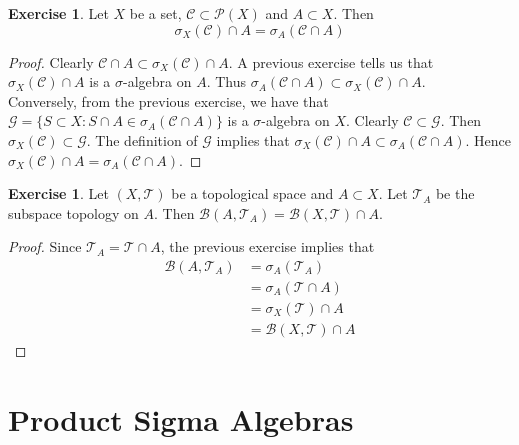 \documentclass{book}
\theoremstyle{definition}
\newtheorem{ex}[definition]{Exercise}
\newcommand{\sig}{\sigma}
\newcommand{\MB}{\mathcal{B}}
\newcommand{\MC}{\mathcal{C}}
\newcommand{\MG}{\mathcal{G}}
\newcommand{\MP}{\mathcal{P}}
\newcommand{\MT}{\mathcal{T}}
\newcommand{\lex}[1]{\label{ex:#1}}
\DeclareMathOperator*{\0}{\mbf{0}}
\DeclareMathOperator*{\1}{\mbf{1}}
\begin{document}
	\begin{ex} \lex{24004} 
		Let $X$ be a set, $\MC \subset \MP(X)$ and $A \subset X$. Then $$\sig_X(\MC) \cap A = \sig_A(\MC \cap A)$$
	\end{ex}
	
	\begin{proof}
		Clearly $\MC \cap A \subset \sig_X(\MC) \cap A$. A previous exercise tells us that $\sig_X(\MC) \cap A$ is a $\sig$-algebra on $A$. Thus $\sig_A(\MC \cap A) \subset \sig_X(\MC) \cap A$. \vspace{3mm} \\ 
		Conversely, from the previous exercise, we have that $\MG = \{S \subset X: S \cap A \in \sig_A(\MC \cap A)\}$ is a $\sig$-algebra on $X$. Clearly $\MC \subset \MG$. Then $\sig_X(\MC) \subset \MG$. The definition of $\MG$ implies that $\sig_X(\MC) \cap A \subset \sig_A(\MC \cap A)$. Hence $\sig_X(\MC) \cap A = \sig_A(\MC \cap A)$.
	\end{proof}

	\begin{ex} \lex{24005}
		Let $(X, \MT)$ be a topological space and $A \subset X$. Let $\MT_A$ be the subspace topology on $A$. Then $\MB(A, \MT_A) = \MB(X, \MT) \cap A$.
	\end{ex}

	\begin{proof}
		Since $\MT_A = \MT \cap A$, the previous exercise implies that 
		\begin{align*}
			\MB(A, \MT_A) 
			& = \sig_A(\MT_A) \\
			& = \sig_A(\MT \cap A) \\
			& = \sig_X(\MT) \cap A \\
			& = \MB(X, \MT) \cap A
		\end{align*}
	\end{proof}
























	\newpage
	\section{Product Sigma Algebras}
	
\end{document}

